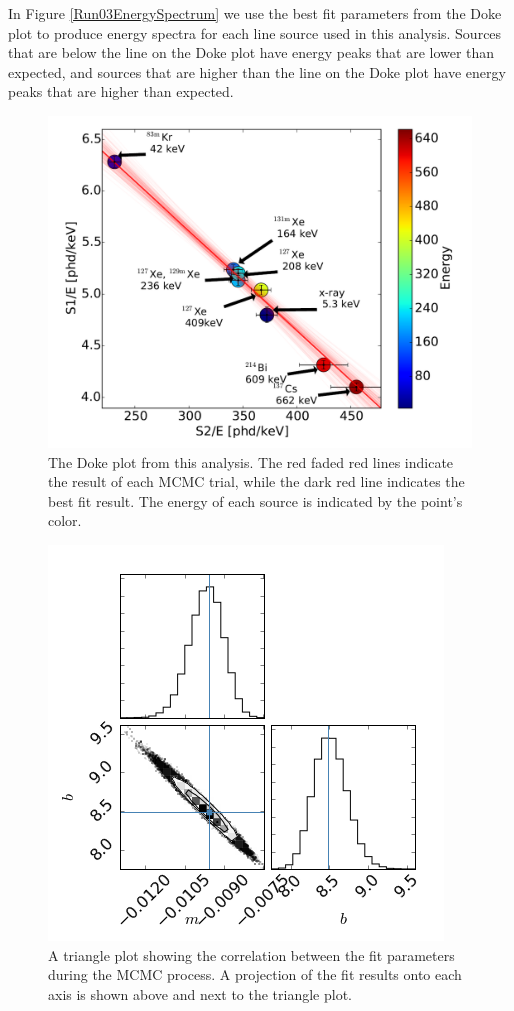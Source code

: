 \documentclass[a4paper,12pt]{article}
\begin{document}
{In Figure \ref{Run03EnergySpectrum} we use the best fit parameters from the Doke plot to produce energy spectra for each line source used in this analysis.  Sources that are below the line on the Doke plot have energy peaks that are lower than expected, and sources that are higher than the line on the Doke plot have energy peaks that are higher than expected.

\begin{figure}[H]
\centering
\includegraphics[scale=0.3]{DokePlot.png}
\caption{The Doke plot from this analysis.  The red faded red lines indicate the result of each MCMC trial, while the dark red line indicates the best fit result.  The energy of each source is indicated by the point's color.}
\label{DokePlot}
\end{figure}

\begin{figure}[H]
\centering
\includegraphics[scale=0.5]{DokeTrianglePlot.png}
\caption{A triangle plot showing the correlation between the fit parameters during the MCMC process. A projection of the fit results onto each axis is shown above and next to the triangle plot.}
\label{Corr}
\end{figure}


}
\end{document}
